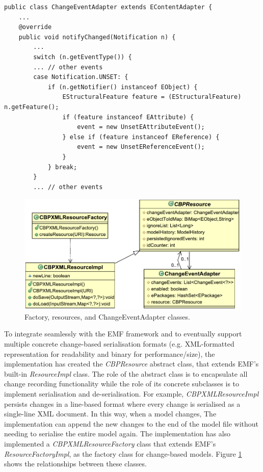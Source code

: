 \documentclass[12pt, a4paper]{report} \usepackage[titletoc]{appendix}
\begin{document}
\begin{lstlisting}[style=java,caption={Simplified Java code to handle notification events.},label=lst:javacode]
public class ChangeEventAdapter extends EContentAdapter {
    ...
    @override
    public void notifyChanged(Notification n) {
        ...
        switch (n.getEventType()) {
        ... // other events
        case Notification.UNSET: {
            if (n.getNotifier() instanceof EObject) {
                EStructuralFeature feature = (EStructuralFeature) n.getFeature();
                if (feature instanceof EAttribute) {
                    event = new UnsetEAttributeEvent();
                } else if (feature instanceof EReference) {
                    event = new UnsetEReferenceEvent();
                }
            } break;
        } 
        ... // other events
\end{lstlisting}

\begin{figure}[th]
	\centering
	\includegraphics[width=0.6\linewidth]{resources}
	\caption{Factory, resources, and ChangeEventAdapter classes.}
	\label{fig:resources}
\end{figure}

To integrate seamlessly with the EMF framework and to eventually support multiple concrete change-based serialisation formats (e.g. XML-formatted representation for readability and binary for performance/size), the implementation has created the \emph{CBPResource} abstract class, that extends EMF's built-in \emph{ResourceImpl} class. The role of the abstract class is to encapsulate all change recording functionality while the role of its concrete subclasses is to implement serialisation and de-serialisation. For example, \emph{CBPXMLResourceImpl} persists changes in a line-based format where every change is serialised as a single-line XML document. In this way, when a model changes, The implementation can append the new changes to the end of the model file without needing to serialise the entire model again. The implementation has also implemented a \emph{CBPXMLResourceFactory} class that extends EMF's \emph{ResourceFactoryImpl}, as the factory class for change-based models. Figure \ref{fig:resources} shows the relationships between these classes.
\end{document}
